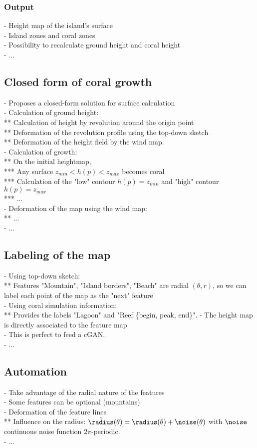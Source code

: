 \subsubsection{Output}
- Height map of the island's surface \\
- Island zones and coral zones \\
- Possibility to recalculate ground height and coral height \\
- ...

\subsection{Closed form of coral growth}
- Proposes a closed-form solution for surface calculation \\
- Calculation of ground height: \\
** Calculation of height by revolution around the origin point \\
** Deformation of the revolution profile using the top-down sketch \\
** Deformation of the height field by the wind map. \\
- Calculation of growth: \\
** On the initial heightmap, \\
*** Any surface $z_{min} < h(p) < z_{max}$ becomes coral \\
*** Calculation of the "low" contour $h(p) = z_{min}$ and "high" contour $h(p) = z_{max}$ \\
*** ... \\
- Deformation of the map using the wind map: \\
** ... \\
- ...

\subsection{Labeling of the map}
- Using top-down sketch: \\
** Features "Mountain", "Island borders", "Beach" are radial $(\theta, r)$, so we can label each point of the map as the "next" feature \\
- Using coral simulation information: \\
** Provides the labels "Lagoon" and "Reef \{begin, peak, end\}".
- The height map is directly associated to the feature map \\
- This is perfect to feed a cGAN. \\
- ... 

\subsection{Automation}
- Take advantage of the radial nature of the features \\
- Some features can be optional (mountains) \\
- Deformation of the feature lines \\ 
** Influence on the radius: $\Tilde \radius(\theta) = \radius(\theta) + \noise(\theta)$ with $\noise$ continuous noise function $2\pi$-periodic. \\
- ...

